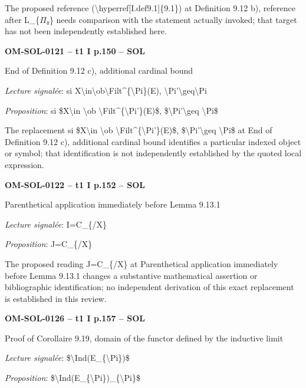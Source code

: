 The proposed reference (\textbackslash{}hyperref[I.def9.1]\{9.1\}) at Definition 9.12 b), reference after L\_\{\ensuremath{\Pi}₀\} needs comparison with the statement actually invoked; that target has not been independently established here.\par
\par\noindent\textbf{OM-SOL-0121 -- t1 I p.150 -- SOL}\par
End of Definition 9.12 c), additional cardinal bound\par
\emph{Lecture signalée}: si X\textbackslash{}in\textbackslash{}ob\textbackslash{}Filt\textasciicircum{}\{\textbackslash{}Pi\}(E), \textbackslash{}Pi'\textbackslash{}geq\textbackslash{}Pi\par
\emph{Proposition}: si \$X\textbackslash{}in \textbackslash{}ob \textbackslash{}Filt\textasciicircum{}\{\textbackslash{}Pi'\}(E)\$, \$\textbackslash{}Pi'\textbackslash{}geq \textbackslash{}Pi\$\par
The replacement si \$X\textbackslash{}in \textbackslash{}ob \textbackslash{}Filt\textasciicircum{}\{\textbackslash{}Pi'\}(E)\$, \$\textbackslash{}Pi'\textbackslash{}geq \textbackslash{}Pi\$ at End of Definition 9.12 c), additional cardinal bound identifies a particular indexed object or symbol; that identification is not independently established by the quoted local expression.\par
\par\noindent\textbf{OM-SOL-0122 -- t1 I p.152 -- SOL}\par
Parenthetical application immediately before Lemma 9.13.1\par
\emph{Lecture signalée}: I=\allowbreak C\_\{/X\}\par
\emph{Proposition}: J=\allowbreak C\_\{/X\}\par
The proposed reading J=\allowbreak C\_\{/X\} at Parenthetical application immediately before Lemma 9.13.1 changes a substantive mathematical assertion or bibliographic identification; no independent derivation of this exact replacement is established in this review.\par
\par\noindent\textbf{OM-SOL-0126 -- t1 I p.157 -- SOL}\par
Proof of Corollaire 9.19, domain of the functor defined by the inductive limit\par
\emph{Lecture signalée}: \$\textbackslash{}Ind(E\_\{\textbackslash{}Pi\})\$\par
\emph{Proposition}: \$\textbackslash{}Ind(E\_\{\textbackslash{}Pi\})\_\{\textbackslash{}Pi\}\$\par

